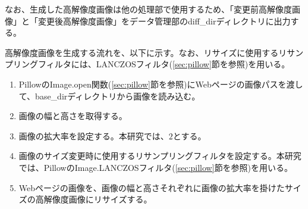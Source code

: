 なお、生成した高解像度画像は他の処理部で使用するため、「変更前高解像度画像」と「変更後高解像度画像」をデータ管理部のdiff\_dirディレクトリに出力する。
\par
高解像度画像を生成する流れを、以下に示す。なお、リサイズに使用するリサンプリングフィルタには、LANCZOSフィルタ(\ref{sec:pillow}節を参照)を用いる。
\begin{enumerate}
    \item PillowのImage.open関数(\ref{sec:pillow}節を参照)にWebページの画像パスを渡して、base\_dirディレクトリから画像を読み込む。
    \item 画像の幅と高さを取得する。
    \item 画像の拡大率を設定する。本研究では、$2$とする。
    \item 画像のサイズ変更時に使用するリサンプリングフィルタを設定する。本研究では、PillowのImage.LANCZOSフィルタ(\ref{sec:pillow}節を参照)を用いる。
    \item Webページの画像を、画像の幅と高さそれぞれに画像の拡大率を掛けたサイズの高解像度画像にリサイズする。
\end{enumerate}


